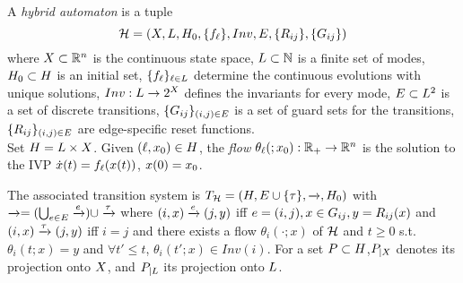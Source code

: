 \begin{defn}
	\label{defn:hybrid system}	
	A \emph{hybrid automaton} is a tuple \[\mathcal{H} = (X,L,H_0,\{f_\ell\}, Inv,E, \{R_{ij}\}, \{G_{ij}\})\] where 
		 $X \subset \mathbb{R}^n$ is the continuous state space, 
		$L \subset \mathbb{N}$ is a finite set of modes,
		 $H_0 \subset H$ is an initial set,
		 $\{f_\ell\}_{\ell \in L}$ determine the continuous evolutions with unique solutions,
		 $Inv: L \rightarrow 2^X$ defines the invariants for every mode,
		 $E \subset L^2$ is a set of discrete transitions,
		 $\{ G_{ij}    \}_{(i,j)\in E}$ is a set of guard sets for the transitions,
		 $\{R_{ij}\}_{(i,j) \in E}$ are edge-specific reset functions.
		 \\
		 Set $H = L\times X$.
		 Given $(\ell,x_0) \in H$, the \emph{flow} $\theta_{\ell}(;x_0):\mathbb{R}_+ \rightarrow \mathbb{R}^n$ is the solution to the IVP $\dot{x}(t) = f_\ell (x(t))$, $x(0)=x_0$.
\end{defn}
%
The associated transition system is $T_{\mathcal{H}} = (H,  E \cup \{\tau\},\xrightarrow{},H_0)$ 
with $\xrightarrow{} = (\bigcup_{e \in E} \xrightarrow{e}) \cup \xrightarrow{\tau}$ 
where $(i,x) \xrightarrow{e} (j,y)$ iff $e = (i,j), x \in G_{ij}, y = R_{ij}(x)$ and $(i,x) \xrightarrow{\tau} (j,y)$ iff $i = j$ and there exists 
a flow $\theta_i(\cdot;x)$ of $\mathcal{H}$ and $t\geq 0$ s.t. $\theta_i(t;x)=y$ and $\forall t' \leq t$, $\theta_i(t';x) \in Inv(i)$.
For a set $P \subset H$,$P_{|X}$ denotes its projection onto $X$, 
and $P_{|L}$ its projection onto $L$. 
